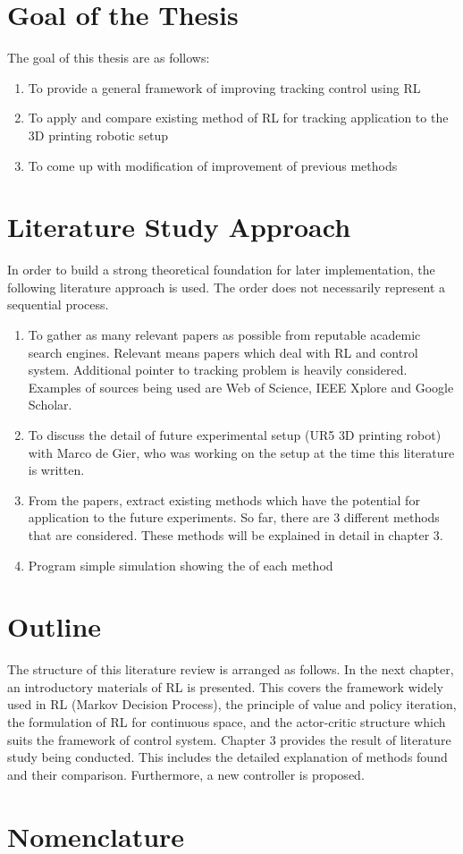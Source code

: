 \section{Goal of the Thesis}

The goal of this thesis are as follows:
\begin{enumerate}
\item To provide a general framework of improving tracking control using \ac{RL}
\item To apply and compare existing method of \ac{RL} for tracking application to the 3D printing robotic setup
\item To come up with modification of improvement of previous methods
\end{enumerate}

\section{Literature Study Approach}
In order to build a strong theoretical foundation for later implementation, the following literature approach is used. The order does not necessarily represent a sequential process.
\begin{enumerate}
	\item To gather as many relevant papers as possible from reputable academic search engines. Relevant means papers which deal with \ac{RL} and control system. Additional pointer to tracking problem is heavily considered. Examples of sources being used are Web of Science, IEEE Xplore and Google Scholar.
	\item To discuss the detail of future experimental setup (UR5 \ac{3D} printing robot) with Marco de Gier, who was working on the setup at the time this literature is written.
	\item From the papers, extract existing methods which have the potential for application to the future experiments. So far, there are 3 different methods that are considered. These methods will be explained in detail in chapter 3.
	\item Program simple simulation showing the of each method
	
\end{enumerate}


\section{Outline}

The structure of this literature review is arranged as follows. In the next chapter, an introductory materials of \ac{RL} is presented. This covers the framework widely used in \ac{RL} (Markov Decision Process), the principle of value and policy iteration, the formulation of \ac{RL} for continuous space, and the actor-critic structure which suits the framework of control system. Chapter 3 provides the result of literature study being conducted. This includes the detailed explanation of methods found and their comparison. Furthermore, a new controller is proposed. 

\section{Nomenclature}


